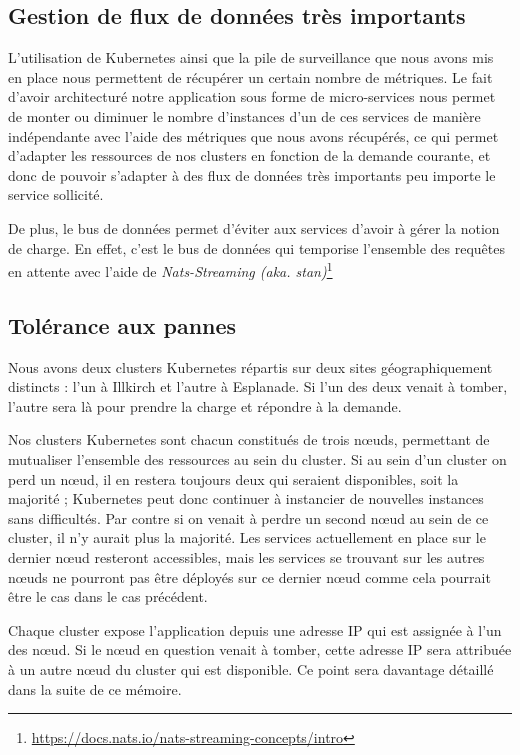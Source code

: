 \subsection{Gestion de flux de données très importants}

L'utilisation de Kubernetes ainsi que la pile de surveillance que nous
avons mis en place nous permettent de récupérer un certain nombre de
métriques. Le fait d'avoir architecturé notre application sous forme de
micro-services nous permet de monter ou diminuer le nombre d'instances
d'un de ces services de manière indépendante avec l'aide des métriques
que nous avons récupérés, ce qui permet d'adapter les ressources de nos
clusters en fonction de la demande courante, et donc de pouvoir
s'adapter à des flux de données très importants peu importe le service
sollicité.

De plus, le bus de données permet d'éviter aux services d'avoir à gérer
la notion de charge. En effet, c'est le bus de données qui temporise
l'ensemble des requêtes en attente avec l'aide de \textit{Nats-Streaming
(aka. stan)}\footnote{\url{https://docs.nats.io/nats-streaming-concepts/intro}}

\subsection{Tolérance aux pannes}

Nous avons deux clusters Kubernetes répartis sur deux sites
géographiquement distincts : l'un à Illkirch et l'autre à Esplanade. Si
l'un des deux venait à tomber, l'autre sera là pour prendre la charge et
répondre à la demande.

Nos clusters Kubernetes sont chacun constitués de trois nœuds,
permettant de mutualiser l'ensemble des ressources au sein du cluster.
Si au sein d'un cluster on perd un nœud, il en restera toujours deux qui
seraient disponibles, soit la majorité ; Kubernetes peut donc continuer
à instancier de nouvelles instances sans difficultés. Par contre si on
venait à perdre un second nœud au sein de ce cluster, il n'y aurait plus
la majorité. Les services actuellement en place sur le dernier nœud
resteront accessibles, mais les services se trouvant sur les autres
nœuds ne pourront pas être déployés sur ce dernier nœud comme cela
pourrait être le cas dans le cas précédent.

Chaque cluster expose l'application depuis une adresse IP qui est
assignée à l'un des nœud. Si le nœud en question venait à tomber, cette
adresse IP sera attribuée à un autre nœud du cluster qui est disponible.
Ce point sera davantage détaillé dans la suite de ce mémoire.


